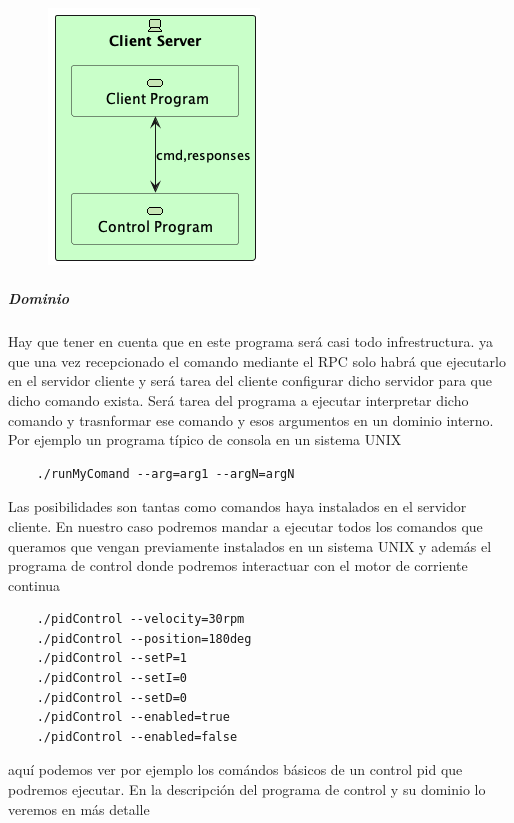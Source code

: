 \begin{figure}[H]
    \centering
    \includegraphics[height=0.3\textheight]{./part/Proyecto_ejecutivo/memoria_descriptiva/descripcionDelProyecto/client/uml/clientServerConcept}
    \caption[Diagrama componentes]{}\label{fig:clientServerConcept}
\end{figure}

\subparagraph{Dominio}

Hay que tener en cuenta que en este programa será casi todo infrestructura. ya que una vez recepcionado el comando mediante el RPC
solo habrá que ejecutarlo en el servidor cliente y será tarea del cliente configurar dicho servidor para que dicho comando exista. Será tarea del programa a ejecutar interpretar dicho comando y trasnformar ese comando y esos argumentos en un dominio interno. Por ejemplo un programa típico de consola en un sistema UNIX

\begin{verbatim}
    ./runMyComand --arg=arg1 --argN=argN
\end{verbatim}


Las posibilidades son tantas como comandos haya instalados en el servidor cliente. En nuestro caso podremos mandar a ejecutar todos los comandos que queramos que vengan previamente instalados en un sistema UNIX y además el programa de control donde podremos interactuar con el motor de corriente continua

\begin{verbatim}
    ./pidControl --velocity=30rpm
    ./pidControl --position=180deg
    ./pidControl --setP=1
    ./pidControl --setI=0
    ./pidControl --setD=0
    ./pidControl --enabled=true
    ./pidControl --enabled=false
\end{verbatim}

aquí podemos ver por ejemplo los comándos básicos de un control pid que podremos ejecutar. En la descripción del programa de control y su dominio lo veremos en más detalle


